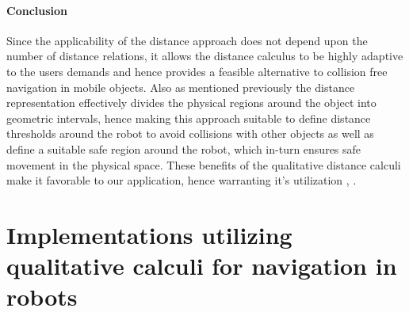 	\paragraph{Conclusion}Since the applicability of the distance approach does not depend upon the number of distance relations, it allows the distance calculus to be highly adaptive to the users demands and hence provides a feasible alternative to collision free navigation in mobile objects. Also as mentioned previously the distance representation effectively divides the physical regions around the object into geometric intervals, hence making this approach suitable to define distance thresholds around the robot to avoid collisions with other objects as well as define a suitable safe region around the robot, which in-turn ensures safe movement in the physical space. These benefits of the qualitative distance calculi make it favorable to our application, hence warranting it's utilization \cite{clementini1997qualitative}, \cite{lowe1975geography}.

	\section{Implementations utilizing qualitative calculi for navigation in robots}
	
